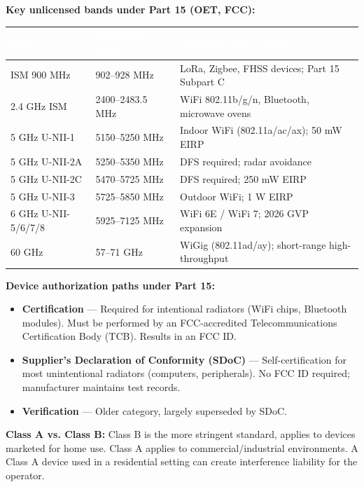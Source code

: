 \documentclass[11pt,letterpaper]{article}
\newcommand{\tableheader}[1]{\textbf{\sffamily\textcolor{white}{#1}}}
\begin{document}
\textbf{Key unlicensed bands under Part 15 (OET, FCC):}

\begin{center}
\begin{tabularx}{\textwidth}{L{3cm}L{3cm}X}
\toprule
{}
\tableheader{Band} & \tableheader{Frequency Range} & \tableheader{Common Use / Notes} \\
\midrule
ISM 900 MHz & 902--928 MHz & LoRa, Zigbee, FHSS devices; Part 15 Subpart C \\
2.4 GHz ISM & 2400--2483.5 MHz & WiFi 802.11b/g/n, Bluetooth, microwave ovens \\
5 GHz U-NII-1 & 5150--5250 MHz & Indoor WiFi (802.11a/ac/ax); 50 mW EIRP \\
5 GHz U-NII-2A & 5250--5350 MHz & DFS required; radar avoidance \\
5 GHz U-NII-2C & 5470--5725 MHz & DFS required; 250 mW EIRP \\
5 GHz U-NII-3 & 5725--5850 MHz & Outdoor WiFi; 1 W EIRP \\
6 GHz U-NII-5/6/7/8 & 5925--7125 MHz & WiFi 6E / WiFi 7; 2026 GVP expansion \\
60 GHz & 57--71 GHz & WiGig (802.11ad/ay); short-range high-throughput \\
\bottomrule
\end{tabularx}
\end{center}

\textbf{Device authorization paths under Part 15:}
\begin{itemize}[leftmargin=1.5em]
  \item \textbf{Certification} --- Required for intentional radiators (WiFi chips, Bluetooth modules). Must be performed by an FCC-accredited Telecommunications Certification Body (TCB). Results in an FCC ID.
  \item \textbf{Supplier's Declaration of Conformity (SDoC)} --- Self-certification for most unintentional radiators (computers, peripherals). No FCC ID required; manufacturer maintains test records.
  \item \textbf{Verification} --- Older category, largely superseded by SDoC.
\end{itemize}

\textbf{Class A vs. Class B:} Class B is the more stringent standard, applies to devices marketed for home use. Class A applies to commercial/industrial environments. A Class A device used in a residential setting can create interference liability for the operator.
\end{document}

